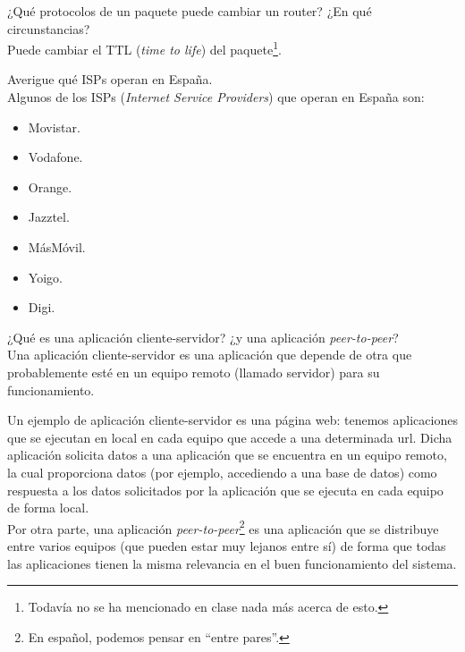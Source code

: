 \begin{ejercicio}
    ¿Qué protocolos de un paquete puede cambiar un router? ¿En qué circunstancias?\\

    Puede cambiar el TTL (\textit{time to life}) del paquete\footnote{Todavía no se ha mencionado en clase nada más acerca de esto.}.
    \begin{comment}
        Un router puede cambiar los protocolos situados debajo de la capa de red, siempre
        que sea necesario debido a que las redes que interconecta tengan dichos protocolos
        diferentes. Por ejemplo, una red doméstica típica es aquella basada en wifi (IEEE
        802.11) y con acceso a Internet contratado con tecnología ADSL\@. En este caso, el
        router inalámbrico deberá modificar el protocolo de las capas físicas y de enlace
        convenientemente.
    \end{comment}
\end{ejercicio}

\begin{ejercicio}
    Averigue qué ISPs operan en España.\\

    Algunos de los ISPs (\textit{Internet Service Providers}) que operan en España son:
    \begin{itemize}
        \item Movistar.
        \item Vodafone.
        \item Orange.
        \item Jazztel.
        \item MásMóvil.
        \item Yoigo.
        \item Digi.
    \end{itemize}
\end{ejercicio}

\begin{ejercicio}
    ¿Qué es una aplicación cliente-servidor? ¿y una aplicación \textit{peer-to-peer}?\\

    Una aplicación cliente-servidor es una aplicación que depende de otra que probablemente esté en un equipo remoto (llamado servidor) para su funcionamiento. 

    Un ejemplo de aplicación cliente-servidor es una página web: tenemos aplicaciones que se ejecutan en local en cada equipo que accede a una determinada url. Dicha aplicación solicita datos a una aplicación que se encuentra en un equipo remoto, la cual proporciona datos (por ejemplo, accediendo a una base de datos) como respuesta a los datos solicitados por la aplicación que se ejecuta en cada equipo de forma local.\\

    Por otra parte, una aplicación \textit{peer-to-peer}\footnote{En español, podemos pensar en ``entre pares''.} es una aplicación que se distribuye entre varios equipos (que pueden estar muy lejanos entre sí) de forma que todas las aplicaciones tienen la misma relevancia en el buen funcionamiento del sistema.
\end{ejercicio}

